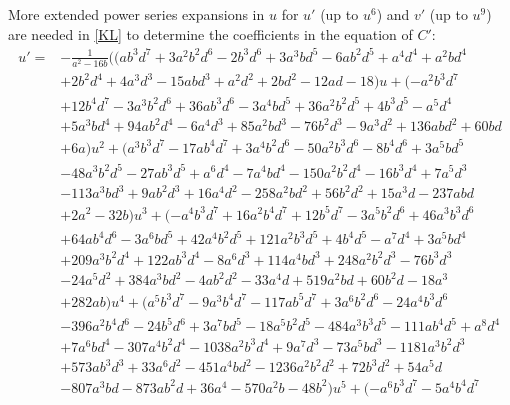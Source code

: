 \documentclass{gtpart}
\theoremstyle{definition}
\theoremstyle{remark}
\begin{document}
More extended power series expansions in $u$ for $u'$ (up to $u^6$) and $v'$ (up to $u^9$) are needed in \eqref{KL} to determine the coefficients in the equation of $C'$: 
\begin{equation*}
\begin{split}
 u' = & -\frac{1}{a^2 - 16 b} \big( (a b^3 d^7 + 3 a^2 b^2 d^6 - 2 b^3 d^6 + 3 a^3 b d^5 - 6 a b^2 d^5 + a^4 d^4 + a^2 b d^4 \\
      & + 2 b^2 d^4 + 4 a^3 d^3 - 15 a b d^3 + a^2 d^2 + 2 b d^2 - 12 a d - 18) u + (-a^2 b^3 d^7 \\
      & + 12 b^4 d^7 - 3 a^3 b^2 d^6 + 36 a b^3 d^6 - 3 a^4 b d^5 + 36 a^2 b^2 d^5 + 4 b^3 d^5 - a^5 d^4 \\
      & + 5 a^3 b d^4 + 94 a b^2 d^4 - 6 a^4 d^3 + 85 a^2 b d^3 - 76 b^2 d^3 - 9 a^3 d^2 + 136 a b d^2 + 60 b d \\
      & + 6 a) u^2 + (a^3 b^3 d^7 - 17 a b^4 d^7 + 3 a^4 b^2 d^6 - 50 a^2 b^3 d^6 - 8 b^4 d^6 + 3 a^5 b d^5 \\
      & - 48 a^3 b^2 d^5 - 27 a b^3 d^5 + a^6 d^4 - 7 a^4 b d^4 - 150 a^2 b^2 d^4 - 16 b^3 d^4 + 7 a^5 d^3 \\
      & - 113 a^3 b d^3 + 9 a b^2 d^3 + 16 a^4 d^2 - 258 a^2 b d^2 + 56 b^2 d^2 + 15 a^3 d - 237 a b d \\
      & + 2 a^2 - 32 b) u^3 + (-a^4 b^3 d^7 + 16 a^2 b^4 d^7 + 12 b^5 d^7 - 3 a^5 b^2 d^6 + 46 a^3 b^3 d^6 \\
      & + 64 a b^4 d^6 - 3 a^6 b d^5 + 42 a^4 b^2 d^5 + 121 a^2 b^3 d^5 + 4 b^4 d^5 - a^7 d^4 + 3 a^5 b d^4 \\
      & + 209 a^3 b^2 d^4 + 122 a b^3 d^4 - 8 a^6 d^3 + 114 a^4 b d^3 + 248 a^2 b^2 d^3 - 76 b^3 d^3 \\
      & - 24 a^5 d^2 + 384 a^3 b d^2 - 4 a b^2 d^2 - 33 a^4 d + 519 a^2 b d + 60 b^2 d - 18 a^3 \\
      & + 282 a b) u^4 + (a^5 b^3 d^7 - 9 a^3 b^4 d^7 - 117 a b^5 d^7 + 3 a^6 b^2 d^6 - 24 a^4 b^3 d^6 \\
      & - 396 a^2 b^4 d^6 - 24 b^5 d^6 + 3 a^7 b d^5 - 18 a^5 b^2 d^5 - 484 a^3 b^3 d^5 - 111 a b^4 d^5 + a^8 d^4 \\
      & + 7 a^6 b d^4 - 307 a^4 b^2 d^4 - 1038 a^2 b^3 d^4 + 9 a^7 d^3 - 73 a^5 b d^3 - 1181 a^3 b^2 d^3 \\
      & + 573 a b^3 d^3 + 33 a^6 d^2 - 451 a^4 b d^2 - 1236 a^2 b^2 d^2 + 72 b^3 d^2 + 54 a^5 d \\
      & - 807 a^3 b d - 873 a b^2 d + 36 a^4 - 570 a^2 b - 48 b^2) u^5 + (-a^6 b^3 d^7 - 5 a^4 b^4 d^7 \\

\end{split}
\end{equation*}
\end{document}
